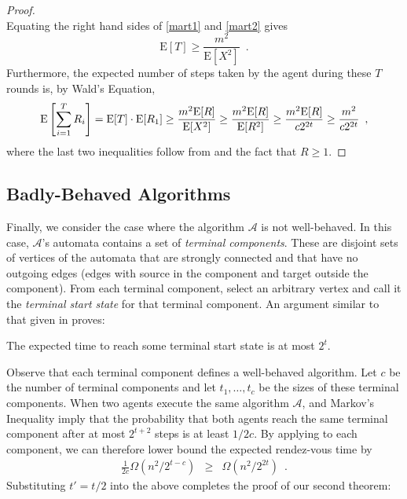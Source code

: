 \documentclass[lotsofwhite]{patmorin}
\newcommand{\E}{\mathrm{E}}
\begin{document}
\begin{proof}
\begin{equation}
\end{equation}
Equating the right hand sides of \eqref{mart1} and \eqref{mart2} gives 
\[
   \E[T] \ge \frac{m^2}{\E[X^2]} \enspace .
\]
Furthermore, the expected number of steps taken by the agent during
these $T$ rounds is, by Wald's Equation, 
\begin{equation}
  \E\left[\sum_{i=1}^T R_i\right] 
    =  \E[T]\cdot\E[R_1] 
    \ge \frac{m^2 \E[R]}{\E[X^2]} 
    \ge \frac{m^2 \E[R]}{\E[R^2]}
    \ge \frac{m^2 \E[R]}{c2^{2t}} 
    \ge \frac{m^2}{c2^{2t}} 
   \enspace ,  \eqlabel{gap}
\end{equation}
where the last two inequalities follow from  and the
fact that $R\ge 1$.
\end{proof}

\subsection{Badly-Behaved Algorithms}

Finally, we consider the case where the algorithm $\mathcal{A}$ is not
well-behaved.  In this case, $\mathcal{A}$'s automata contains a set
of \emph{terminal components}.  These are disjoint sets of vertices of the
automata that are strongly connected and that have no outgoing edges (edges
with source in the component and target outside the component). From each 
terminal component, select an arbitrary vertex and call it
the \emph{terminal start state} for that terminal component.
An argument similar to that given in  proves:

\begin{lem}
The expected time to reach some terminal start state is at most $2^t$.
\end{lem}

Observe that each terminal component defines a well-behaved algorithm.
Let $c$ be the number of terminal components and let $t_1,\ldots,t_c$ be
the sizes of these terminal components.  When two agents execute the same
algorithm $\mathcal{A}$,  and Markov's Inequality
imply that the probability
that both agents reach the same terminal component after at most $2^{t+2}$
steps is at least $1/2c$.  By applying  to each component, we can therefore lower bound the expected rendez-vous time by
\begin{eqnarray*}
  \frac{1}{2c}\Omega(n^2/2^{t-c})
    & \ge & \Omega(n^2/2^{2t}) \enspace .
\end{eqnarray*}
Substituting $t'=t/2$ into the above completes the proof of our second theorem:
\end{document}
